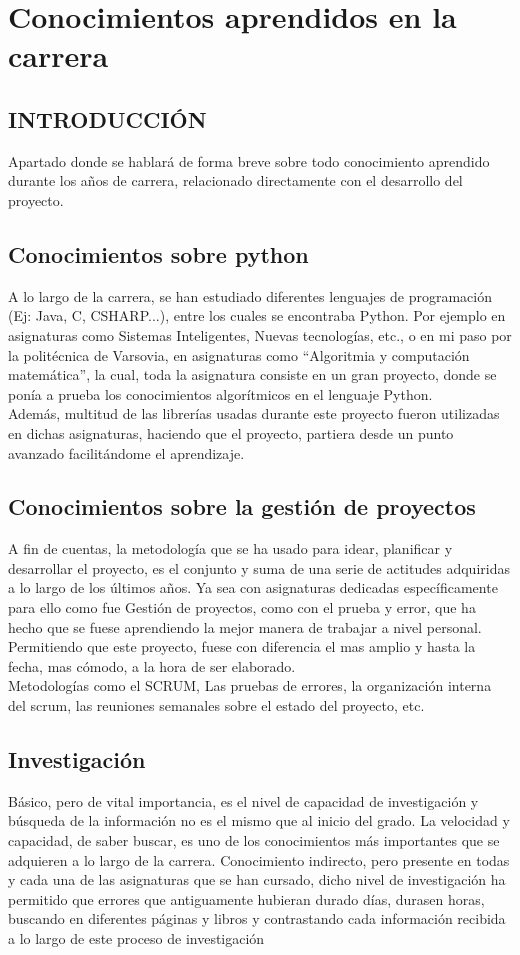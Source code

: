 \section{Conocimientos aprendidos en la carrera}
\subsection{INTRODUCCIÓN}
Apartado donde se hablará de forma breve sobre todo conocimiento aprendido durante los años de carrera, relacionado directamente con el desarrollo del proyecto.
\subsection{Conocimientos sobre python}
A lo largo de la carrera, se han estudiado diferentes lenguajes de programación (Ej: Java, C, CSHARP...), entre los cuales se encontraba Python. Por ejemplo en asignaturas como Sistemas Inteligentes, Nuevas tecnologías, etc., o en mi paso por la politécnica de Varsovia, en asignaturas como “Algoritmia y computación matemática”, la cual, toda la asignatura consiste en un gran proyecto, donde se ponía a prueba los conocimientos algorítmicos en el lenguaje Python.\\

Además, multitud de las librerías usadas durante este proyecto fueron utilizadas en dichas asignaturas, haciendo que el proyecto, partiera desde un punto avanzado facilitándome el aprendizaje.
\subsection{Conocimientos sobre la gestión de proyectos}
A fin de cuentas, la metodología que se ha usado para idear, planificar y desarrollar el proyecto, es el conjunto y suma de una serie de actitudes adquiridas a lo largo de los últimos años. Ya sea con asignaturas dedicadas específicamente para ello como fue Gestión de proyectos, como con el prueba y error, que ha hecho que se fuese aprendiendo la mejor manera de trabajar a nivel personal. Permitiendo que este proyecto, fuese con diferencia el mas amplio y hasta la fecha, mas cómodo, a la hora de ser elaborado.\\

Metodologías como el SCRUM, Las pruebas de errores, la organización interna del scrum, las reuniones semanales sobre el estado del proyecto, etc.
\subsection{Investigación}
Básico, pero de vital importancia, es el nivel de capacidad de investigación y búsqueda de la información no es el mismo que al inicio del grado. La velocidad y capacidad, de saber buscar, es uno de los conocimientos más importantes que se adquieren a lo largo de la carrera. Conocimiento indirecto, pero presente en todas y cada una de las asignaturas que se han cursado, dicho nivel de investigación ha permitido que errores que antiguamente hubieran durado días, durasen horas, buscando en diferentes páginas y libros y contrastando cada información recibida a lo largo de este proceso de investigación
